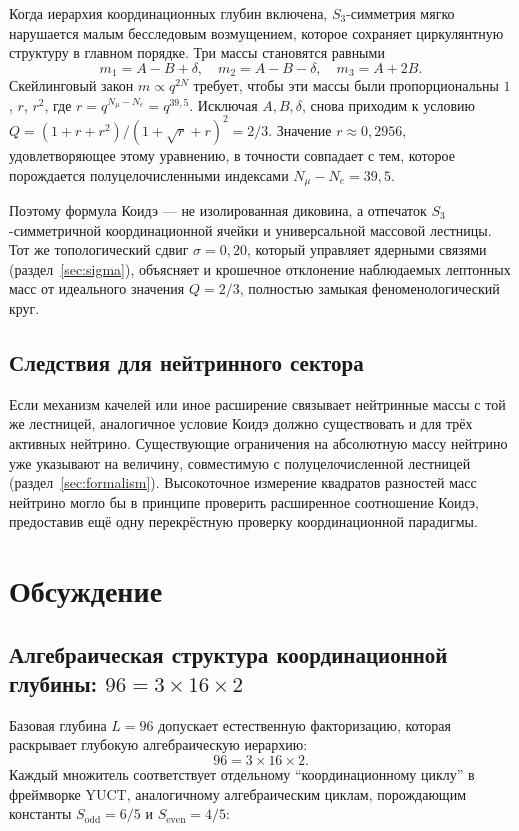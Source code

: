 \documentclass[11pt,a4paper]{article}
\newcommand{\Sodd}{S_{\mathrm{odd}}}
\newcommand{\Seven}{S_{\mathrm{even}}}
\begin{document}
Когда иерархия координационных глубин включена, $S_3$-симметрия мягко
нарушается малым бесследовым возмущением, которое сохраняет циркулянтную
структуру в главном порядке.  Три массы становятся равными
\begin{equation}
	m_1 = A - B + \delta,\quad
	m_2 = A - B - \delta,\quad
	m_3 = A + 2B.
\end{equation}
Скейлинговый закон $m \propto q^{2N}$ требует, чтобы эти массы были
пропорциональны $1$, $r$, $r^2$, где $r = q^{N_\mu - N_e} = q^{39{,}5}$.
Исключая $A,B,\delta$, снова приходим к условию
$Q = (1+r+r^2)/(1+\sqrt{r}+r)^2 = 2/3$.  Значение $r \approx 0{,}2956$,
удовлетворяющее этому уравнению, в точности совпадает с тем, которое
порождается полуцелочисленными индексами $N_\mu - N_e = 39{,}5$.

Поэтому формула Коидэ — не изолированная диковина, а отпечаток
$S_3$-симметричной координационной ячейки и универсальной массовой
лестницы.  Тот же топологический сдвиг $\sigma = 0{,}20$, который
управляет ядерными связями (раздел~\ref{sec:sigma}), объясняет и
крошечное отклонение наблюдаемых лептонных масс от идеального значения
$Q = 2/3$, полностью замыкая феноменологический круг.

\subsection{Следствия для нейтринного сектора}

Если механизм качелей или иное расширение связывает нейтринные массы с
той же лестницей, аналогичное условие Коидэ должно существовать и для
трёх активных нейтрино.  Существующие ограничения на абсолютную массу
нейтрино уже указывают на величину, совместимую с полуцелочисленной
лестницей (раздел~\ref{sec:formalism}).  Высокоточное измерение квадратов
разностей масс нейтрино могло бы в принципе проверить расширенное
соотношение Коидэ, предоставив ещё одну перекрёстную проверку
координационной парадигмы.

	\section{Обсуждение}
	\label{sec:discussion}
	
	\subsection{Алгебраическая структура координационной глубины: \(96 = 3 \times 16 \times 2\)}
	
	Базовая глубина \(L = 96\) допускает естественную факторизацию, которая раскрывает глубокую алгебраическую иерархию:
	\[
	96 = 3 \times 16 \times 2.
	\]
	Каждый множитель соответствует отдельному ``координационному циклу'' в фреймворке YUCT, аналогичному алгебраическим циклам, порождающим константы \(\Sodd = 6/5\) и \(\Seven = 4/5\):
	
\end{document}

